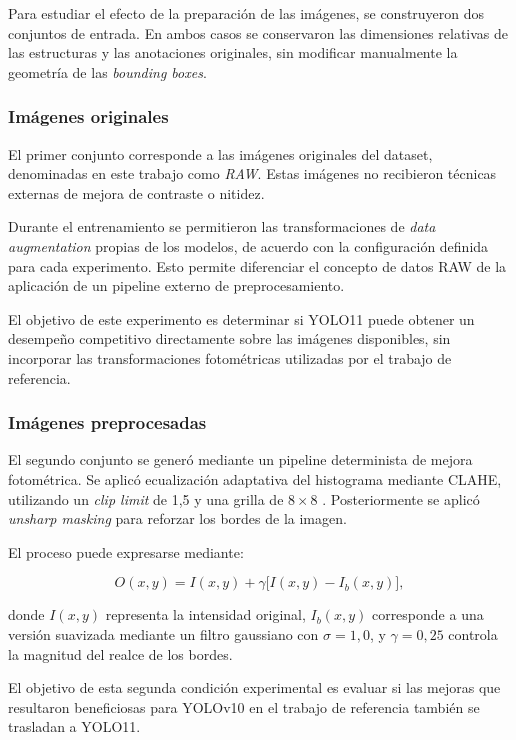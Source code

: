\documentclass[conference]{IEEEtran}
\begin{document}
Para estudiar el efecto de la preparación de las imágenes, se construyeron dos conjuntos de entrada. En ambos casos se conservaron las dimensiones relativas de las estructuras y las anotaciones originales, sin modificar manualmente la geometría de las \textit{bounding boxes}.

\subsubsection{Imágenes originales}

El primer conjunto corresponde a las imágenes originales del dataset, denominadas en este trabajo como \textit{RAW}. Estas imágenes no recibieron técnicas externas de mejora de contraste o nitidez.

Durante el entrenamiento se permitieron las transformaciones de \textit{data augmentation} propias de los modelos, de acuerdo con la configuración definida para cada experimento. Esto permite diferenciar el concepto de datos RAW de la aplicación de un pipeline externo de preprocesamiento.

El objetivo de este experimento es determinar si YOLO11 puede obtener un desempeño competitivo directamente sobre las imágenes disponibles, sin incorporar las transformaciones fotométricas utilizadas por el trabajo de referencia.

\subsubsection{Imágenes preprocesadas}

El segundo conjunto se generó mediante un pipeline determinista de mejora fotométrica. Se aplicó ecualización adaptativa del histograma mediante CLAHE, utilizando un \textit{clip limit} de 1,5 y una grilla de $8\times8$ \cite{b3_srinivasu}. Posteriormente se aplicó \textit{unsharp masking} para reforzar los bordes de la imagen.

El proceso puede expresarse mediante:

\begin{equation}
O(x,y) = I(x,y) + \gamma\bigl[I(x,y) - I_b(x,y)\bigr],
\label{eq:unsharp}
\end{equation}

donde $I(x,y)$ representa la intensidad original, $I_b(x,y)$ corresponde a una versión suavizada mediante un filtro gaussiano con $\sigma=1,0$, y $\gamma=0,25$ controla la magnitud del realce de los bordes.

El objetivo de esta segunda condición experimental es evaluar si las mejoras que resultaron beneficiosas para YOLOv10 en el trabajo de referencia también se trasladan a YOLO11.
\end{document}
